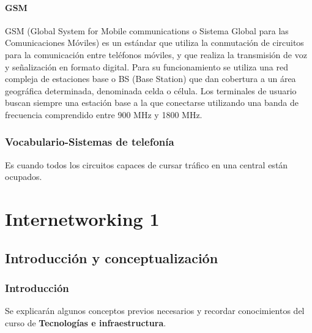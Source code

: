\documentclass[
	12pt, %
	fleqn, %
	a4paper, %
	oneside, %
]{LegrandOrangeBook}
\begin{document}
\subsection{GSM}
GSM (Global System for Mobile communications o Sistema Global para las Comunicaciones Móviles) es un estándar que utiliza la conmutación de circuitos para la comunicación entre teléfonos móviles, y que realiza la transmisión de voz y señalización en formato digital. Para su funcionamiento se utiliza una red compleja de estaciones base o BS (Base Station) que dan cobertura a un área geográfica determinada, denominada celda o célula. Los terminales de usuario buscan siempre una estación base a la que conectarse utilizando una banda de frecuencia comprendido entre 900 MHz y 1800 MHz.
\newpage
\section*{Vocabulario-Sistemas de telefonía}
\begin{vocabulary}[Congestión]
Es cuando todos los circuitos capaces de cursar tráfico en una central están ocupados.
\end{vocabulary}
\part{Internetworking 1}
\chapter{Introducción y conceptualización}
\section{Introducción}
Se explicarán algunos conceptos previos necesarios y recordar conocimientos del curso de \textbf{Tecnologías e infraestructura}.
\end{document}

